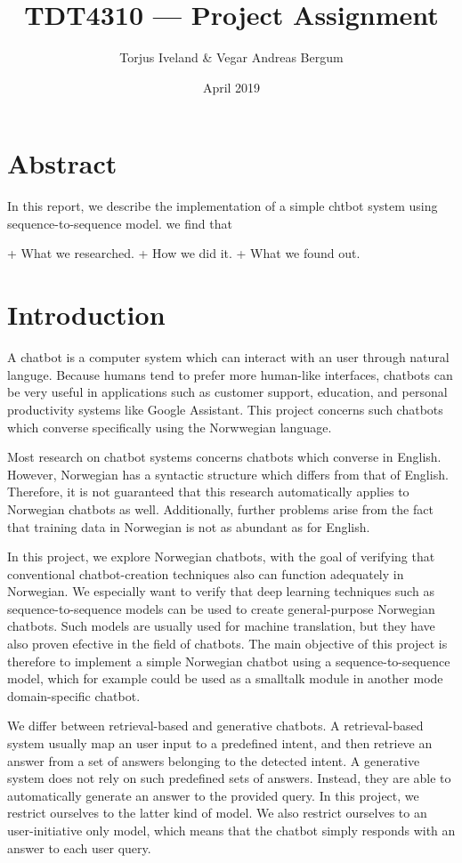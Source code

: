 \documentclass{article}
\title{TDT4310 --- Project Assignment}
\author{Torjus Iveland \& Vegar Andreas Bergum}
\date{April 2019}
\begin{document}
\maketitle

\section{Abstract}

In this report, we describe the implementation of a simple chtbot system
using sequence-to-sequence model. we find that

+ What we researched.
+ How we did it.
+ What we found out.

\section{Introduction}

A chatbot is a computer system which can interact with an user through natural languge. Because
humans tend to prefer more human-like interfaces, chatbots can be very useful in applications
such as customer support, education, and personal productivity systems like Google Assistant.
This project concerns such chatbots which converse specifically using the Norwwegian language.

Most research on chatbot systems concerns chatbots which converse in English. However, Norwegian
has a syntactic structure which differs from that of English. Therefore, it is not guaranteed that
this research automatically applies to Norwegian chatbots as well. Additionally, further problems
arise from the fact that training data in Norwegian is not as abundant as for English.

In this project, we explore Norwegian chatbots, with the goal of verifying that conventional
chatbot-creation techniques also can function adequately in Norwegian. We especially want to
verify that deep learning techniques such as sequence-to-sequence models \cite{Cho2014} can be
used to create general-purpose Norwegian chatbots. Such models are usually used for machine
translation, but they have also proven efective in the field of chatbots. The main objective
of this project is therefore to implement a simple Norwegian chatbot using a sequence-to-sequence
model, which for example could be used as a smalltalk module in another mode domain-specific chatbot.

We differ between retrieval-based and generative chatbots. A retrieval-based system usually map
an user input to a predefined intent, and then retrieve an answer from a set of answers belonging
to the detected intent. A generative system does not rely on such predefined sets of answers.
Instead, they are able to automatically generate an answer to the provided query. In this project,
we restrict ourselves to the latter kind of model. We also restrict ourselves to an user-initiative
only model, which means that the chatbot simply responds with an answer to each user query.
\end{document}
